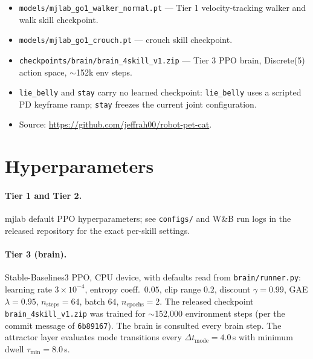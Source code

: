 \documentclass[11pt]{article}
\begin{document}
\begin{itemize}[leftmargin=*,nosep]
  \item \texttt{models/mjlab\_go1\_walker\_normal.pt} --- Tier 1 velocity-tracking
        walker and walk skill checkpoint.
  \item \texttt{models/mjlab\_go1\_crouch.pt} --- crouch skill checkpoint.
  \item \texttt{checkpoints/brain/brain\_4skill\_v1.zip} --- Tier 3
        PPO brain, Discrete(5) action space, $\sim$152k env steps.
  \item \texttt{lie\_belly} and \texttt{stay} carry no learned checkpoint:
        \texttt{lie\_belly} uses a scripted PD keyframe ramp;
        \texttt{stay} freezes the current joint configuration.
  \item Source: \url{https://github.com/jeffrah00/robot-pet-cat}.
\end{itemize}

\section{Hyperparameters}

\paragraph{Tier 1 and Tier 2.} mjlab default PPO hyperparameters; see
\texttt{configs/} and W\&B run logs in the released repository for the
exact per-skill settings.

\begin{sloppypar}
\paragraph{Tier 3 (brain).} Stable-Baselines3 PPO, CPU device, with
defaults read from \texttt{brain/runner.py}:
learning rate $3\!\times\!10^{-4}$, entropy coeff.\ $0.05$, clip range $0.2$,
discount $\gamma = 0.99$, GAE $\lambda = 0.95$, $n_{\text{steps}} = 64$,
batch $64$, $n_{\text{epochs}} = 2$. The released checkpoint
\texttt{brain\_4skill\_v1.zip} was trained for $\sim$152{,}000
environment steps (per the commit message of \texttt{6b89167}). The
brain is consulted every brain step. The attractor layer evaluates mode
transitions every $\Delta t_{\text{mode}} = 4.0$\,s with minimum dwell
$\tau_{\min} = 8.0$\,s.
\end{sloppypar}
\end{document}
